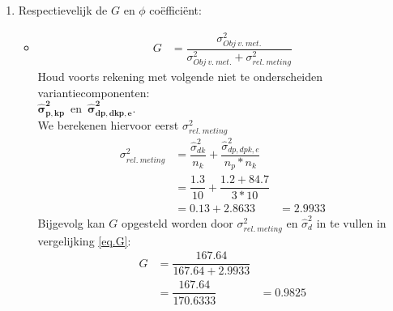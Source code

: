 {\begin{enumerate}
\item Respectievelijk de $G$ en $\phi$ co\"effici\"ent:
\begin{itemize}
	\item
	\begin{align}
		G &=\dfrac{\sigma^2_{Obj~v.~met.}}{\sigma^2_{Obj~v.~met.}+ \sigma^2_{rel.~meting}} \label{eq.G}
	\end{align}
	Houd voorts rekening met volgende niet te onderscheiden variantiecomponenten:~ \\
	$ \bm{\hat{\sigma}^2_{p,kp}} $~en~$\bm{\hat{\sigma}^2_{dp, dkp, e} }$.\\
	We berekenen hiervoor eerst $\sigma^2_{rel.~meting}$
	\begin{align*}
		\sigma^2_{rel.~meting} 	&=  \dfrac{\hat{\sigma}^2_{dk}}{n_k} + \dfrac{\hat{\sigma}^2_{dp,dpk,e}}{n_p*n_k} \\
								&=  \dfrac{{1.3}}{10} + \dfrac{{1.2 + 84.7}}{3*10}\\
								&= 0.13 + 2.8633 &=2.9933
	\end{align*}
	Bijgevolg kan $G$ opgesteld worden door $\sigma^2_{rel.~meting}$ en $\hat{\sigma}^2_{d}$ in te vullen in vergelijking \ref{eq.G}:
	\begin{align*}
		G 	&=\dfrac{167.64}{167.64+ 2.9933}\\
			&=\dfrac{167.64}{170.6333}&=0.9825
	\end{align*}


\end{itemize}
\end{enumerate}}

